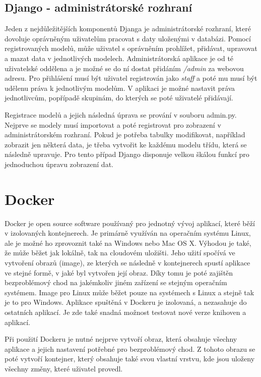 \subsection{Django - administrátorské rozhraní}

Jeden z nejdůležitějších komponentů Djanga je administrátorské
rozhraní, které dovoluje oprávněným uživatelům pracovat s daty
uloženými v databázi. Pomocí registrovaných modelů, může uživatel s
oprávněním prohlížet, přidávat, upravovat a mazat data v jednotlivých
modelech. Administrátorská aplikace je od té uživatelské oddělena a je
možné se do ní dostat přidáním \textit{/admin} za webovou adresu. Pro
přihlášení musí být uživatel registrován jako \textit{staff} a poté mu
musí být udělenu práva k jednotlivým modelům. V aplikaci je možné
nastavit práva jednotlivcům, popřípadě skupinám, do kterých se poté
uživatelé přidávají.

Registrace modelů a jejich následná úprava se prování v souboru
admin.py. Nejprve se modely musí importovat a poté registrovat pro
zobrazení v administrátorském rozhraní. Pokud je potřeba tabulky
modifikovat, například zobrazit jen některá data, je třeba vytvořit ke
každému modelu třídu, která se následně upravuje. Pro tento případ
Django disponuje velkou škálou funkcí pro jednoduchou úpravu zobrazení
dat. \cite{django-admin}

\newpage

\section{Docker}

Docker je open source software používaný pro jednotný vývoj aplikací,
které běží v izolovaných kontejnerech. Je primárně využíván na
operačním systému Linux, ale je možné ho zprovoznit také na Windows
nebo Mac OS X. Výhodou je také, že může běžet jak lokálně, tak na
cloudovém uložišti. Jeho užití spočívá ve vytvoření obrazů (image), ze 
kterých se následně v kontejnerech spustí aplikace ve stejné formě, 
v jaké byl vytvořen její obraz. Díky tomu je poté zajištěn bezproblémový 
chod na jakémkoliv jiném zařízení se stejným operačním systémem. Image 
pro Linux může běžet pouze na systémech s Linux a stejně tak je to pro
Windows. Aplikace spuštěná v Dockeru je izolovaná, a nezasahuje do
ostatních aplikací. Je zde také snadná možnost testovat nové verze
knihoven a aplikací.

Při použití Dockeru je nutné nejprve vytvoří obraz, která obsahuje 
všechny aplikace a jejich nastavení potřebné pro bezproblémový chod. 
Z tohoto obrazu se poté vytvoří kontejner, který obsahuje také svou 
vlastní vrstvu, kde jsou uloženy všechny změny, které uživatel provedl.
\cite{docker}



